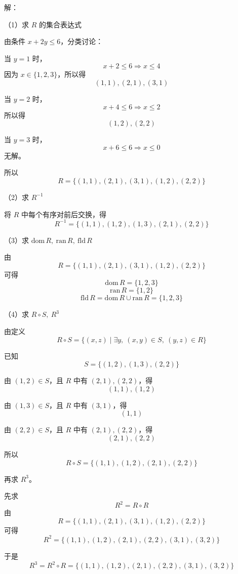 \documentclass[12pt,a4paper]{ctexart}
\begin{document}
\vspace{0.5em}

\noindent
解：

\noindent
（1）求 $R$ 的集合表达式

由条件 $x+2y\le 6$，分类讨论：

当 $y=1$ 时，
\[
x+2\le 6 \Rightarrow x\le 4
\]
因为 $x\in\{1,2,3\}$，所以得
\[
(1,1),(2,1),(3,1)
\]

当 $y=2$ 时，
\[
x+4\le 6 \Rightarrow x\le 2
\]
所以得
\[
(1,2),(2,2)
\]

当 $y=3$ 时，
\[
x+6\le 6 \Rightarrow x\le 0
\]
无解。

所以
\[
R=\{(1,1),(2,1),(3,1),(1,2),(2,2)\}
\]

\vspace{0.5em}

\noindent
（2）求 $R^{-1}$

将 $R$ 中每个有序对前后交换，得
\[
R^{-1}=\{(1,1),(1,2),(1,3),(2,1),(2,2)\}
\]

\vspace{0.5em}

\noindent
（3）求 $\mathrm{dom}\,R,\ \mathrm{ran}\,R,\ \mathrm{fld}\,R$

由
\[
R=\{(1,1),(2,1),(3,1),(1,2),(2,2)\}
\]
可得
\[
\mathrm{dom}\,R=\{1,2,3\}
\]
\[
\mathrm{ran}\,R=\{1,2\}
\]
\[
\mathrm{fld}\,R=\mathrm{dom}\,R\cup \mathrm{ran}\,R=\{1,2,3\}
\]

\vspace{0.5em}

\noindent
（4）求 $R\circ S,\ R^3$

由定义
\[
R\circ S=\{(x,z)\mid \exists y,\ (x,y)\in S,\ (y,z)\in R\}
\]

已知
\[
S=\{(1,2),(1,3),(2,2)\}
\]

由 $(1,2)\in S$，且 $R$ 中有 $(2,1),(2,2)$，得
\[
(1,1),(1,2)
\]

由 $(1,3)\in S$，且 $R$ 中有 $(3,1)$，得
\[
(1,1)
\]

由 $(2,2)\in S$，且 $R$ 中有 $(2,1),(2,2)$，得
\[
(2,1),(2,2)
\]

所以
\[
R\circ S=\{(1,1),(1,2),(2,1),(2,2)\}
\]

再求 $R^3$。

先求
\[
R^2=R\circ R
\]
由
\[
R=\{(1,1),(2,1),(3,1),(1,2),(2,2)\}
\]
可得
\[
R^2=\{(1,1),(1,2),(2,1),(2,2),(3,1),(3,2)\}
\]

于是
\[
R^3=R^2\circ R=\{(1,1),(1,2),(2,1),(2,2),(3,1),(3,2)\}
\]
\end{document}
